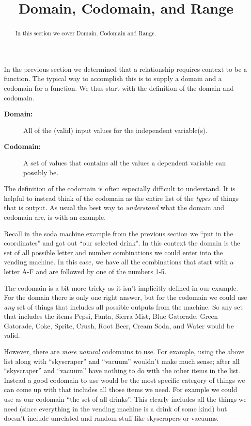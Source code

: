 \documentclass{ximeraXloud}
\title{Domain, Codomain, and Range}
\begin{document}
\begin{abstract}
    In this section we cover Domain, Codomain and Range.
\end{abstract}
\maketitle
In the previous section we determined that a relationship requires context to be a function. The typical way to accomplish this is to supply a domain and a codomain for a function. We thus start with the definition of the domain and codomain.

\begin{description}
    \item[\textbf{Domain:}] All of the (valid) input values for the independent variable(s).
    \item[\textbf{Codomain:}] A set of values that contains all the values a dependent variable can possibly be.
\end{description}

The definition of the codomain is often especially difficult to understand. It is helpful to instead think of the codomain as the entire list of the \textit{types} of things that is output. As usual the best way to \textit{understand} what the domain and codomain are, is with an example.

Recall in the soda machine example from the previous section we ``put in the coordinates" and got out ``our selected drink". In this context the domain is the set of all possible letter and number combinations we could enter into the vending machine. In this case, we have all the combinations that start with a letter A-F and are followed by one of the numbers 1-5.

The codomain is a bit more tricky as it isn't implicitly defined in our example. For the domain there is only one right answer, but for the codomain we could use \textit{any} set of things that includes all possible outputs from the machine. So any set that includes the items Pepsi, Fanta, Sierra Mist, Blue Gatorade, Green Gatorade, Coke, Sprite, Crush, Root Beer, Cream Soda, and Water would be valid.

However, there are \textit{more natural} codomains to use. For example, using the above list along with ``skyscraper'' and ``vacuum'' wouldn't make much sense; after all ``skyscraper'' and ``vacuum'' have nothing to do with the other items in the list. Instead a good codomain to use would be the most specific category of things we can come up with that includes all those items we need. For example we could use as our codomain ``the set of all drinks''. This clearly includes all the things we need (since everything in the vending machine is a drink of some kind) but doesn't include unrelated and random stuff like skyscrapers or vacuums.
\end{document}
